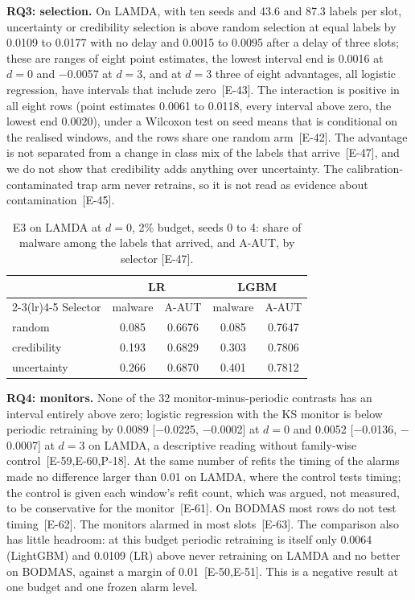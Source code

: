\documentclass[conference,a4paper]{IEEEtran}
\newcommand{\clm}[1]{{\scriptsize[#1]}}
\begin{document}
\textbf{RQ3: selection.} On LAMDA, with ten seeds and 43.6 and 87.3 labels per slot, uncertainty or credibility selection is above random selection at equal labels by 0.0109 to 0.0177 with no delay and 0.0015 to 0.0095 after a delay of three slots; these are ranges of eight point estimates, the lowest interval end is 0.0016 at $d=0$ and $-$0.0057 at $d=3$, and at $d=3$ three of eight advantages, all logistic regression, have intervals that include zero~\clm{E-43}. The interaction is positive in all eight rows (point estimates 0.0061 to 0.0118, every interval above zero, the lowest end 0.0020), under a Wilcoxon test on seed means that is conditional on the realised windows, and the rows share one random arm~\clm{E-42}. The advantage is not separated from a change in class mix of the labels that arrive~\clm{E-47}, and we do not show that credibility adds anything over uncertainty. The calibration-contaminated trap arm never retrains, so it is not read as evidence about contamination~\clm{E-45}.

\begin{table}[t]
\centering
\caption{E3 on LAMDA at $d{=}0$, 2\% budget, seeds 0 to 4: share of malware among the labels that arrived, and A-AUT, by selector \clm{E-47}.}
\label{tab:e3}
\small
\begin{tabular}{@{}lcccc@{}}
\toprule
 & \multicolumn{2}{c}{LR} & \multicolumn{2}{c}{LGBM}\\
\cmidrule(lr){2-3}\cmidrule(lr){4-5}
Selector & malware & A-AUT & malware & A-AUT\\
\midrule
random & 0.085 & 0.6676 & 0.085 & 0.7647\\
credibility & 0.193 & 0.6829 & 0.303 & 0.7806\\
uncertainty & 0.266 & 0.6870 & 0.401 & 0.7812\\
\bottomrule
\end{tabular}
\end{table}

\textbf{RQ4: monitors.} None of the 32 monitor-minus-periodic contrasts has an interval entirely above zero; logistic regression with the KS monitor is below periodic retraining by 0.0089 [$-$0.0225, $-$0.0002] at $d=0$ and 0.0052 [$-$0.0136, $-$0.0007] at $d=3$ on LAMDA, a descriptive reading without family-wise control~\clm{E-59,E-60,P-18}. At the same number of refits the timing of the alarms made no difference larger than 0.01 on LAMDA, where the control tests timing; the control is given each window's refit count, which was argued, not measured, to be conservative for the monitor~\clm{E-61}. On BODMAS most rows do not test timing~\clm{E-62}. The monitors alarmed in most slots~\clm{E-63}. The comparison also has little headroom: at this budget periodic retraining is itself only 0.0064 (LightGBM) and 0.0109 (LR) above never retraining on LAMDA and no better on BODMAS, against a margin of 0.01~\clm{E-50,E-51}. This is a negative result at one budget and one frozen alarm level.
\end{document}
